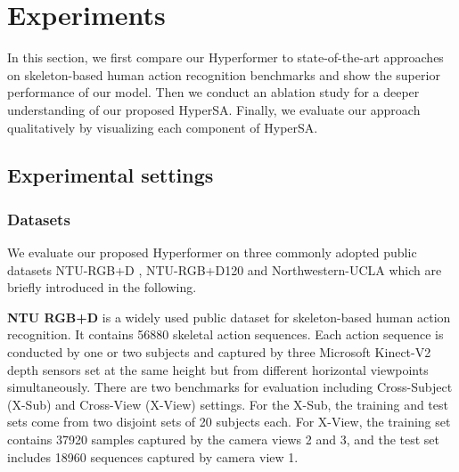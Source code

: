 \documentclass[10pt,twocolumn,letterpaper]{article}
\begin{document}







\section{Experiments}
In this section, we first compare our Hyperformer to  state-of-the-art approaches on skeleton-based human action recognition benchmarks and show the superior performance of our model. 
Then we conduct an ablation study for a deeper understanding of our proposed HyperSA. Finally, we evaluate our approach qualitatively by visualizing each component of HyperSA.

\subsection{Experimental settings}
\subsubsection{Datasets}
\label{data}
We evaluate our proposed Hyperformer on three commonly adopted public datasets NTU-RGB+D \cite{shahroudy2016ntu}, NTU-RGB+D120 \cite{liu2019ntu} and Northwestern-UCLA \cite{wang2014cross} which are briefly introduced in the following. 


\noindent
\textbf{NTU RGB+D} 
\cite{shahroudy2016ntu} is a widely used public dataset for skeleton-based human action recognition. It contains
56880 skeletal action sequences. 
Each action sequence is conducted by one or two subjects and captured by three Microsoft Kinect-V2 depth sensors set at the same height but from different horizontal viewpoints simultaneously. 
There are two benchmarks for evaluation including Cross-Subject (X-Sub)
and Cross-View (X-View) settings. For the X-Sub, the training and test sets come from two disjoint sets of 20 subjects each. 
For X-View, the training set contains 37920 samples captured by the camera views 2 and 3, and the test set includes 18960 sequences captured by camera view 1. 
\end{document}

